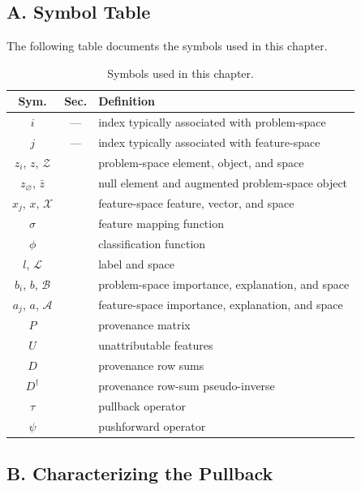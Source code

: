 \subsection*{A. Symbol Table}

The following table documents the symbols used in this chapter.

\begin{table}[H]
  \setlength{\tabcolsep}{4pt}
  \renewcommand{\arraystretch}{0.92}
  \footnotesize
    \centering
    \begin{tabular}{@{}c | c | l@{}}
      Sym. & Sec. & Definition \\
      \toprule
      $i$ & --- & index typically associated with problem-space \\
      $j$ & --- & index typically associated with feature-space \\
      \midrule
      $z_i$, $z$, $\mathcal{Z}$ &  & problem-space element, object, and space \\
      $z_\varnothing$, $\bar{z}$ &  & null element and augmented problem-space object \\
      $x_j$, $x$, $\mathcal{X}$ &  & feature-space feature, vector, and space \\
      $\sigma$ &  & feature mapping function \\
      $\phi$ &  & classification function \\
      $l$, $\mathcal{L}$ &  & label and space \\
      \midrule
      $b_i$, $b$, $\mathcal{B}$ &  & problem-space importance, explanation, and space \\
      $a_j$, $a$, $\mathcal{A}$ &  & feature-space importance, explanation, and space \\
      \midrule
      $P$ &  & provenance matrix \\
      $U$ &  & unattributable features \\
      $D$ &  & provenance row sums \\
      $D^\dagger$ &  & provenance row-sum pseudo-inverse \\
      $\tau$ &  & pullback operator \\
      $\psi$ &  & pushforward operator \\
      \bottomrule
    \end{tabular}
  \caption{Symbols used in this chapter.}
  \label{tab:XML:Symbol_Table}
\end{table}

\subsection*{B. Characterizing the Pullback}

